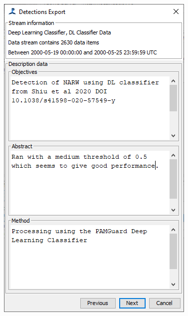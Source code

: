\documentclass[
]{article}
\begin{document}
\begin{figure}
\begin{minipage}{0.33\linewidth}
{\includegraphics[width=0.99\linewidth,height=\textheight,keepaspectratio]{./media/export3.png}

}


\end{minipage}%
%
\begin{minipage}{0.33\linewidth}

\centering{

}
\end{minipage}
\end{figure}
\end{document}
